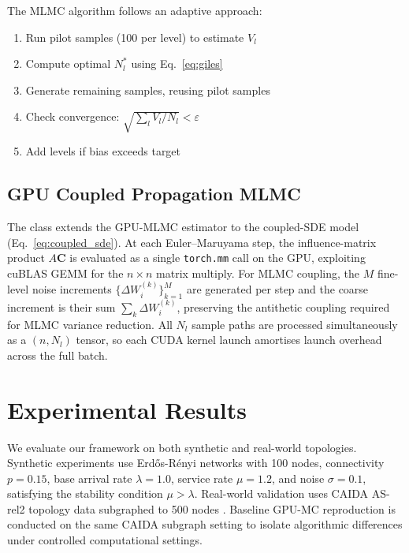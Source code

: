 \documentclass{ieeeaccess}
\begin{document}
The MLMC algorithm follows an adaptive approach:
\begin{enumerate}
    \item Run pilot samples (100 per level) to estimate $V_l$
    \item Compute optimal $N_l^*$ using Eq.~\eqref{eq:giles}
    \item Generate remaining samples, reusing pilot samples
    \item Check convergence: $\sqrt{\sum_l V_l/N_l} < \varepsilon$
    \item Add levels if bias exceeds target
\end{enumerate}

\subsection{GPU Coupled Propagation MLMC}
\label{subsec:gpu_coupled}

The  class extends the GPU-MLMC estimator to the coupled-SDE
model (Eq.~\eqref{eq:coupled_sde}). At each Euler--Maruyama step, the influence-matrix product
$A\mathbf{C}$ is evaluated as a single \texttt{torch.mm} call on the GPU, exploiting cuBLAS GEMM
for the $n \times n$ matrix multiply. For MLMC coupling, the $M$ fine-level noise increments
$\{\Delta W_i^{(k)}\}_{k=1}^{M}$ are generated per step and the coarse increment is their sum
$\sum_k \Delta W_i^{(k)}$, preserving the antithetic coupling required for MLMC variance
reduction. All $N_l$ sample paths are processed simultaneously as a $(n{,}N_l)$ tensor, so each
CUDA kernel launch amortises launch overhead across the full batch.

\section{Experimental Results}

We evaluate our framework on both synthetic and real-world topologies. Synthetic experiments use
Erd\H{o}s-R\'enyi networks with 100 nodes, connectivity $p=0.15$, base arrival rate $\lambda=1.0$,
service rate $\mu=1.2$, and noise $\sigma=0.1$, satisfying the stability condition $\mu > \lambda$.
Real-world validation uses CAIDA AS-rel2 topology data subgraphed to 500 nodes
\cite{hofstad2016}. Baseline GPU-MC reproduction is conducted on the same CAIDA subgraph setting
to isolate algorithmic differences under controlled computational settings.
\end{document}
